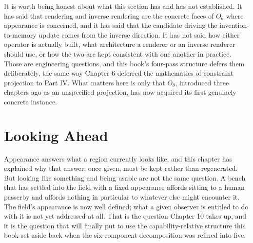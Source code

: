 It is worth being honest about what this section has and has not established. It has said that rendering and inverse rendering are the concrete faces of \(O_\theta\) where appearance is concerned, and it has said that the candidate driving the invention-to-memory update comes from the inverse direction. It has not said how either operator is actually built, what architecture a renderer or an inverse renderer should use, or how the two are kept consistent with one another in practice. Those are engineering questions, and this book's four-pass structure defers them deliberately, the same way Chapter 6 deferred the mathematics of constraint projection to Part IV. What matters here is only that \(O_\theta\), introduced three chapters ago as an unspecified projection, has now acquired its first genuinely concrete instance.

\section{Looking Ahead}

Appearance answers what a region currently looks like, and this chapter has explained why that answer, once given, must be kept rather than regenerated. But looking like something and being usable are not the same question. A bench that has settled into the field with a fixed appearance affords sitting to a human passerby and affords nothing in particular to whatever else might encounter it. The field's appearance is now well defined; what a given observer is entitled to do with it is not yet addressed at all. That is the question Chapter 10 takes up, and it is the question that will finally put to use the capability-relative structure this book set aside back when the six-component decomposition was refined into five.
